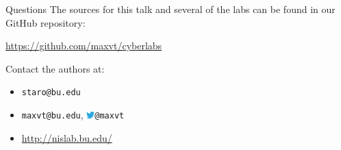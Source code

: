\documentclass{beamer}
\begin{document}
	\begin{frame}{Questions}
		The sources for this talk and several of the labs can be found in our GitHub repository:
		\vfill
		\begin{center}
		\url{https://github.com/maxvt/cyberlabs}
		\end{center}
		\vfill
		Contact the authors at:
		\begin{itemize}
			\item \texttt{staro@bu.edu}
			\item \texttt{maxvt@bu.edu}, \includegraphics[width=9pt]{Twitter_bird_logo_2012.png}\hspace{0.2em}\texttt{@maxvt}
			\item \url{http://nislab.bu.edu/}
		\end{itemize}	
	\end{frame}
\end{document}
